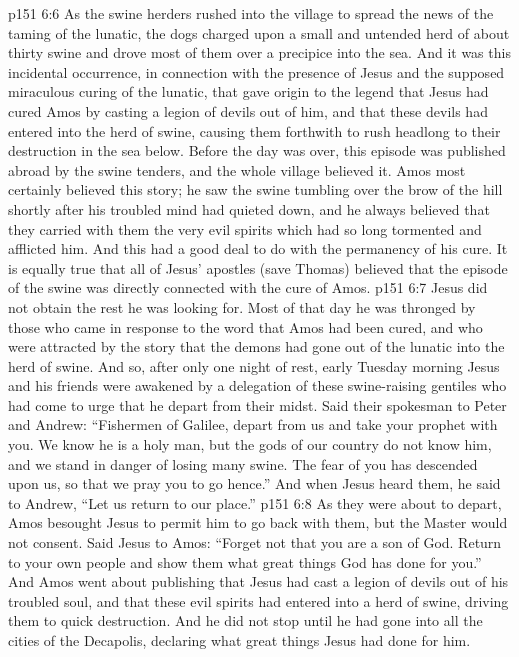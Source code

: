\vs p151 6:6 As the swine herders rushed into the village to spread the news of the taming of the lunatic, the dogs charged upon a small and untended herd of about thirty swine and drove most of them over a precipice into the sea. And it was this incidental occurrence, in connection with the presence of Jesus and the supposed miraculous curing of the lunatic, that gave origin to the legend that Jesus had cured Amos by casting a legion of devils out of him, and that these devils had entered into the herd of swine, causing them forthwith to rush headlong to their destruction in the sea below. Before the day was over, this episode was published abroad by the swine tenders, and the whole village believed it. Amos most certainly believed this story; he saw the swine tumbling over the brow of the hill shortly after his troubled mind had quieted down, and he always believed that they carried with them the very evil spirits which had so long tormented and afflicted him. And this had a good deal to do with the permanency of his cure. It is equally true that all of Jesus’ apostles (save Thomas) believed that the episode of the swine was directly connected with the cure of Amos.
\vs p151 6:7 \pc Jesus did not obtain the rest he was looking for. Most of that day he was thronged by those who came in response to the word that Amos had been cured, and who were attracted by the story that the demons had gone out of the lunatic into the herd of swine. And so, after only one night of rest, early Tuesday morning Jesus and his friends were awakened by a delegation of these swine\hyp{}raising gentiles who had come to urge that he depart from their midst. Said their spokesman to Peter and Andrew: “Fishermen of Galilee, depart from us and take your prophet with you. We know he is a holy man, but the gods of our country do not know him, and we stand in danger of losing many swine. The fear of you has descended upon us, so that we pray you to go hence.” And when Jesus heard them, he said to Andrew, \textcolor{ubdarkred}{“Let us return to our place.”}
\vs p151 6:8 As they were about to depart, Amos besought Jesus to permit him to go back with them, but the Master would not consent. Said Jesus to Amos: \textcolor{ubdarkred}{“Forget not that you are a son of God. Return to your own people and show them what great things God has done for you.”} And Amos went about publishing that Jesus had cast a legion of devils out of his troubled soul, and that these evil spirits had entered into a herd of swine, driving them to quick destruction. And he did not stop until he had gone into all the cities of the Decapolis, declaring what great things Jesus had done for him.
